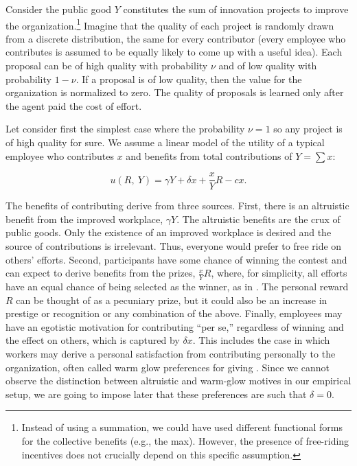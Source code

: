 \documentclass[11pt]{article}
\begin{document}
Consider the public good \(Y\) constitutes the sum of innovation
projects to improve the organization.\footnote{Instead of using a
  summation, we could have used different functional forms for the
  collective benefits (e.g., the max). However, the presence of
  free-riding incentives does not crucially depend on this specific
  assumption.} Imagine that the quality of each project is randomly
drawn from a discrete distribution, the same for every contributor
(every employee who contributes is assumed to be equally likely to come
up with a useful idea). Each proposal can be of high quality with
probability \(\nu\) and of low quality with probability \(1-\nu\). If a
proposal is of low quality, then the value for the organization is
normalized to zero. The quality of proposals is learned only after the
agent paid the cost of effort.

Let consider first the simplest case where the probability \(\nu=1\) so
any project is of high quality for sure. We assume a linear model of the
utility of a typical employee who contributes \(x\) and benefits from
total contributions of \(Y=\sum x\):

\begin{equation}\label{eq:utility}
  u(R,~ Y) =  \gamma Y + \delta x + \frac{x}{Y} R - c x.
\end{equation}

The benefits of contributing derive from three sources. First, there is
an altruistic benefit from the improved workplace, \(\gamma Y\). The
altruistic benefits are the crux of public goods. Only the existence of
an improved workplace is desired and the source of contributions is
irrelevant. Thus, everyone would prefer to free ride on others' efforts.
Second, participants have some chance of winning the contest and can
expect to derive benefits from the prizes, \(\frac{x}{Y} R\), where, for
simplicity, all efforts have an equal chance of being selected as the
winner, as in \citet{morgan2000financing}. The personal reward \(R\) can
be thought of as a pecuniary prize, but it could also be an increase in
prestige or recognition or any combination of the above. Finally,
employees may have an egotistic motivation for contributing ``per se,''
regardless of winning and the effect on others, which is captured by
\(\delta x\). This includes the case in which workers may derive a
personal satisfaction from contributing personally to the organization,
often called warm glow preferences for giving \citep{andreoni1995warm}.
Since we cannot observe the distinction between altruistic and warm-glow
motives in our empirical setup, we are going to impose later that these
preferences are such that \(\delta=0\).
\end{document}
